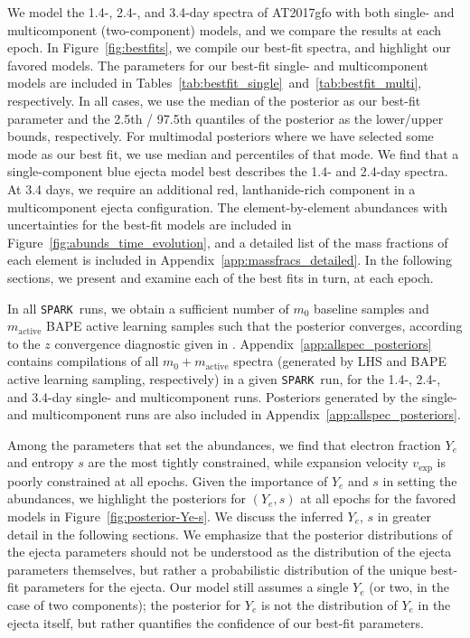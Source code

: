 \documentclass[twocolumn,twocolappendix]{aastex63}
\def\SPARK{\texttt{SPARK}}
\begin{document}
{{{{{{We model the 1.4-, 2.4-, and 3.4-day spectra of AT2017gfo with both single- and multicomponent (two-component) models, and we compare the results at each epoch. In Figure~\ref{fig:bestfits}, we compile our best-fit spectra, and highlight our favored models. The parameters for our best-fit single- and multicomponent models are included in Tables~\ref{tab:bestfit_single}~and~\ref{tab:bestfit_multi}, respectively. In all cases, we use the median of the posterior as our best-fit parameter and the 2.5th / 97.5th quantiles of the posterior as the lower/upper bounds, respectively. For multimodal posteriors where we have selected some mode as our best fit, we use median and percentiles of that mode. We find that a single-component blue ejecta model best describes the 1.4- and 2.4-day spectra. At 3.4 days, we require an additional red, lanthanide-rich component in a multicomponent ejecta configuration. The element-by-element abundances with uncertainties for the best-fit models are included in Figure~\ref{fig:abunds_time_evolution}, and a detailed list of the mass fractions of each element is included in Appendix~\ref{app:massfracs_detailed}. In the following sections, we present and examine each of the best fits in turn, at each epoch. 

In all \SPARK~runs, we obtain a sufficient number of $m_0$ baseline samples and $m_{\mathrm{active}}$ BAPE active learning samples such that the posterior converges, according to the $z$ convergence diagnostic given in \cite{fleming20}. Appendix~\ref{app:allspec_posteriors} contains compilations of all $m_0 + m_{\mathrm{active}}$ spectra (generated by LHS and BAPE active learning sampling, respectively) in a given \SPARK~run, for the 1.4-, 2.4-, and 3.4-day single- and multicomponent runs. Posteriors generated by the single- and multicomponent runs are also included in Appendix~\ref{app:allspec_posteriors}. 

Among the parameters that set the abundances, we find that electron fraction $Y_e$ and entropy $s$ are the most tightly constrained, while expansion velocity $v_{\mathrm{exp}}$ is poorly constrained at all epochs. Given the importance of $Y_e$ and $s$ in setting the abundances, we highlight the posteriors for $(Y_e, s)$ at all epochs for the favored models in Figure~\ref{fig:posterior-Ye-s}. We discuss the inferred $Y_e$, $s$ in greater detail in the following sections. We emphasize that the posterior distributions of the ejecta parameters should not be understood as the distribution of the ejecta parameters themselves, but rather a probabilistic distribution of the unique best-fit parameters for the ejecta. Our model still assumes a single $Y_e$ (or two, in the case of two components); the posterior for $Y_e$ is not the distribution of $Y_e$ in the ejecta itself, but rather quantifies the confidence of our best-fit parameters.


}}}}}}
\end{document}
